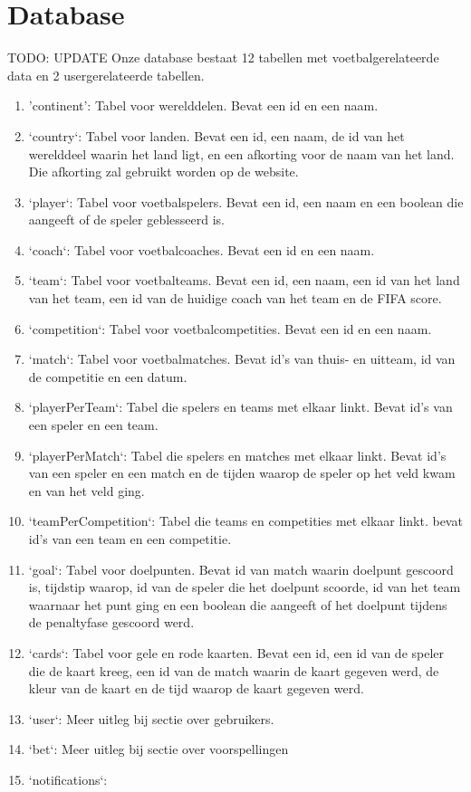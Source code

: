 \documentclass[11pt, a4paper]{article}
\begin{document}
\section{Database}
TODO: UPDATE
Onze database bestaat 12 tabellen met voetbalgerelateerde data en 2 usergerelateerde tabellen.
\begin{enumerate}
\item 'continent': Tabel voor werelddelen. Bevat een id en een naam.
\item `country`: Tabel voor landen. Bevat een id, een naam, de id van het werelddeel waarin het land ligt, en een afkorting voor de naam van het land. Die afkorting zal gebruikt worden op de website.
\item `player`: Tabel voor voetbalspelers. Bevat een id, een naam en een boolean die aangeeft of de speler geblesseerd is.
\item `coach`: Tabel voor voetbalcoaches. Bevat een id en een naam.
\item `team`: Tabel voor voetbalteams. Bevat een id, een naam, een id van het land van het team, een id van de huidige coach van het team en de FIFA score.
\item `competition`: Tabel voor voetbalcompetities. Bevat een id en een naam.
\item `match`: Tabel voor voetbalmatches. Bevat id's van thuis- en uitteam, id van de competitie en een datum.
\item `playerPerTeam`: Tabel die spelers en teams met elkaar linkt. Bevat id's van een speler en een team.
\item `playerPerMatch`: Tabel die spelers en matches met elkaar linkt. Bevat id's van een speler en een match en de tijden waarop de speler op het veld kwam en van het veld ging.
\item `teamPerCompetition`: Tabel die teams en competities met elkaar linkt. bevat id's van een team en een competitie.
\item `goal`: Tabel voor doelpunten. Bevat id van match waarin doelpunt gescoord is, tijdstip waarop, id van de speler die het doelpunt scoorde, id van het team waarnaar het punt ging en een boolean die aangeeft of het doelpunt tijdens de penaltyfase gescoord werd.
\item `cards`: Tabel voor gele en rode kaarten. Bevat een id, een id van de speler die de kaart kreeg, een id van de match waarin de kaart gegeven werd, de kleur van de kaart en de tijd waarop de kaart gegeven werd.
\item `user`: Meer uitleg bij sectie over gebruikers.
\item `bet`: Meer uitleg bij sectie over voorspellingen
\item `notifications`:
\end{enumerate}
\end{document}

